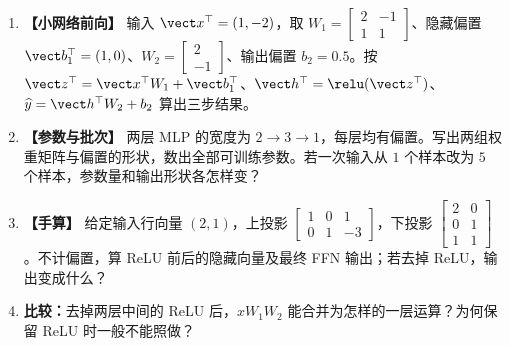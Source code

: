 \begin{enumerate}[label={},leftmargin=4.8em,itemsep=4pt]
\item[\textbf{C-033.}] \leavevmode{}\label{exercise:C-033}\label{exercise:mlp-activation-forward}\textbf{【小网络前向】} 输入 $\vect x^\top=(1,-2)$，取 $W_1=\begin{bmatrix}2&-1\\1&1\end{bmatrix}$、隐藏偏置 $\vect b_1^\top=(1,0)$、$W_2=\begin{bmatrix}2\\-1\end{bmatrix}$、输出偏置 $b_2=0.5$。按 $\vect z^\top=\vect x^\top W_1+\vect b_1^\top$、$\vect h^\top=\relu(\vect z^\top)$、$\widehat{y}=\vect h^\top W_2+b_2$ 算出三步结果。
\item[\textbf{C-034.}] \leavevmode{}\label{exercise:C-034}\label{exercise:mlp-parameter-count}\textbf{【参数与批次】} 两层 MLP 的宽度为 $2\to3\to1$，每层均有偏置。写出两组权重矩阵与偏置的形状，数出全部可训练参数。若一次输入从 $1$ 个样本改为 $5$ 个样本，参数量和输出形状各怎样变？
\item[\textbf{C-035.}] \leavevmode{}\label{exercise:C-035}\label{exercise:mlp-negative-activation}\textbf{【手算】} 给定输入行向量 $(2,1)$，上投影 $\begin{bmatrix}1&0&1\\0&1&-3\end{bmatrix}$，下投影 $\begin{bmatrix}2&0\\0&1\\1&1\end{bmatrix}$。不计偏置，算 ReLU 前后的隐藏向量及最终 FFN 输出；若去掉 ReLU，输出变成什么？
\item[\textbf{C-036.}] \leavevmode{}\label{exercise:C-036}\label{exercise:mlp-linear-composition}\textbf{比较：}去掉两层中间的 ReLU 后，$xW_1W_2$ 能合并为怎样的一层运算？为何保留 ReLU 时一般不能照做？
\end{enumerate}
